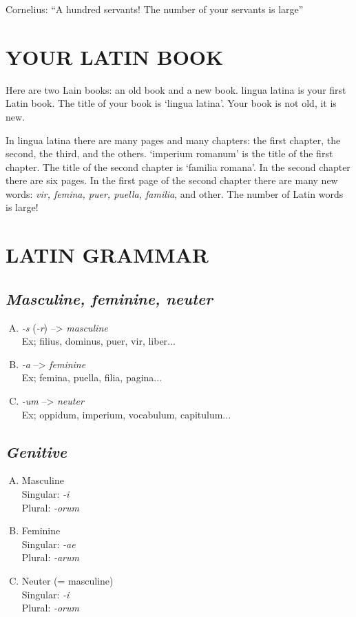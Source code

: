 Cornelius: ``A hundred servants! The number of your servants is large''


\section[You Latin book]{YOUR LATIN BOOK}

Here are two Lain books: an old book and a new book. {\sc lingua latina} is your first Latin book. The title of your book is `{\sc lingua latina}'. Your book is not old, it is new.

In {\sc lingua latina} there are many pages and many chapters: the first chapter, the second, the third, and the others. `imperium romanum' is the title of the first chapter. The title of the second chapter is `familia romana'. In the second chapter there are six pages. In the first page of the second chapter there are many new words: \emph{vir, femina, puer, puella, familia}, and other. The number of Latin words is large!



\section[Grammar]{LATIN GRAMMAR}

\subsection{\emph{Masculine, feminine, neuter}}

\begin{enumerate}[(A)]
  \item \emph{-s} (\emph{-r}) --> \emph{masculine}\\
    Ex; filius, dominus, puer, vir, liber...
  \item \emph{-a} --> \emph{feminine}\\
    Ex; femina, puella, filia, pagina...
  \item \emph{-um} --> \emph{neuter}\\
    Ex; oppidum, imperium, vocabulum, capitulum...
\end{enumerate}

\subsection{\emph{Genitive}}
\begin{enumerate}[(A)]
  \item Masculine\\
    Singular: \emph{-i}\\
    Plural: \emph{-orum}
  \item Feminine\\
    Singular: \emph{-ae}\\
    Plural: \emph{-arum}
  \item Neuter (= masculine)\\
    Singular: \emph{-i}\\
    Plural: \emph{-orum}
\end{enumerate}

